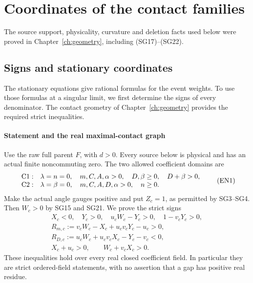 \chapter{Coordinates of the contact families}
\label{ch:entry}
\label{component:p477c0ac30750}
\label{p477c0ac30750:sec:rederived-contact-entry}
The source support, physicality, curvature and deletion facts used below were proved in Chapter~\ref{ch:geometry}, including (SG17)--(SG22).
\section{Signs and stationary coordinates}
\label{component:paf13bbf8fd32}

\label{paf13bbf8fd32:sec:global-native-entry-rederived}

The stationary equations give rational formulas for the event weights.
To use those formulas at a singular limit, we first determine the signs
of every denominator. The contact geometry of Chapter~\ref{ch:geometry}
provides the required strict inequalities.

\subsubsection*{Statement and the real maximal-contact graph}

Use the raw full parent \(F\), with \(d>0\).
Every source below is physical and has an actual finite noncommuting
zero.  The two allowed coefficient domains are
\[
\begin{array}{ll}
 {\rm C1}:&\lambda=n=0,\quad m,C,A,\alpha>0,\quad
 D,\beta\ge0,\quad D+\beta>0,\\
 {\rm C2}:&\lambda=\beta=0,\quad m,C,A,D,\alpha>0,\quad n\ge0.
\end{array}\tag{EN1}
\]
Make the actual angle gauges positive and put \(Z_c=1\), as permitted
by SG3--SG4.  Then \(W_c>0\) by SG15 and SG21.  We prove the strict signs
\[
\begin{gathered}
 X_c<0,\quad Y_c>0,\quad u_cW_c-Y_c>0,\quad
 1-v_cY_c>0,\\
 R_{m,c}:=v_cW_c-X_c+u_cv_cY_c-u_c>0,\\
 R_{D,c}:=u_cW_c+u_cv_cX_c-Y_c-v_c<0,\\
 X_c+u_c>0,\qquad W_c+v_cX_c>0.
\end{gathered}\tag{EN2}
\]
These inequalities hold over every real closed coefficient field.
In particular they are strict ordered-field statements, with no
assertion that a gap has positive real residue.

